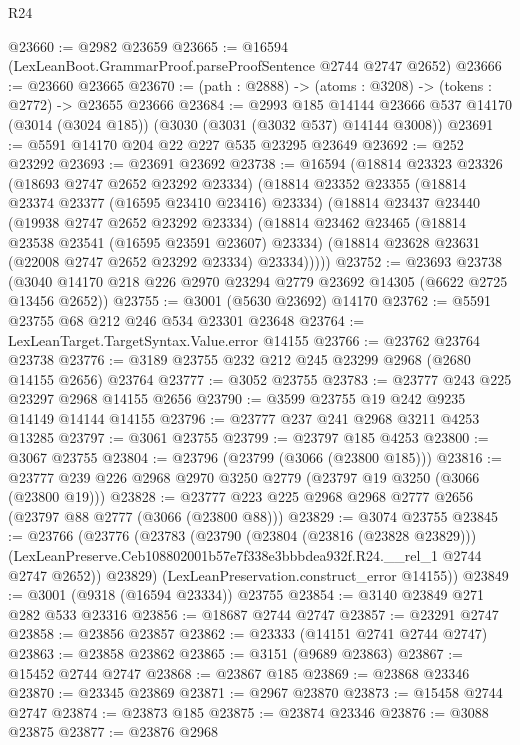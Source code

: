 \begin{lexlean}{R24}
\begin{coremodule}
@23660 := @2982 @23659
@23665 := @16594 (LexLeanBoot.GrammarProof.parseProofSentence @2744 @2747 @2652)
@23666 := @23660 @23665
@23670 := (path : @2888) -> (atoms : @3208) -> (tokens : @2772) -> @23655 @23666
@23684 := @2993
    @185
    @14144
    @23666
    @537
    @14170
    (@3014 (@3024 @185))
    (@3030 (@3031 (@3032 @537) @14144 @3008))
@23691 := @5591 @14170 @204 @22 @227 @535 @23295 @23649
@23692 := @252 @23292
@23693 := @23691 @23692
@23738 := @16594
    (@18814
      @23323
      @23326
      (@18693 @2747 @2652 @23292 @23334)
      (@18814
        @23352
        @23355
        (@18814 @23374 @23377 (@16595 @23410 @23416) @23334)
        (@18814
          @23437
          @23440
          (@19938 @2747 @2652 @23292 @23334)
          (@18814
            @23462
            @23465
            (@18814 @23538 @23541 (@16595 @23591 @23607) @23334)
            (@18814 @23628 @23631 (@22008 @2747 @2652 @23292 @23334) @23334)))))
@23752 := @23693
    @23738
    (@3040 @14170 @218 @226 @2970 @23294 @2779 @23692 @14305 (@6622 @2725 @13456 @2652))
@23755 := @3001 (@5630 @23692) @14170
@23762 := @5591 @23755 @68 @212 @246 @534 @23301 @23648
@23764 := LexLeanTarget.TargetSyntax.Value.error @14155
@23766 := @23762 @23764 @23738
@23776 := @3189 @23755 @232 @212 @245 @23299 @2968 (@2680 @14155 @2656) @23764
@23777 := @3052 @23755
@23783 := @23777 @243 @225 @23297 @2968 @14155 @2656
@23790 := @3599 @23755 @19 @242 @9235 @14149 @14144 @14155
@23796 := @23777 @237 @241 @2968 @3211 @4253 @13285
@23797 := @3061 @23755
@23799 := @23797 @185 @4253
@23800 := @3067 @23755
@23804 := @23796 (@23799 (@3066 (@23800 @185)))
@23816 := @23777 @239 @226 @2968 @2970 @3250 @2779 (@23797 @19 @3250 (@3066 (@23800 @19)))
@23828 := @23777 @223 @225 @2968 @2968 @2777 @2656 (@23797 @88 @2777 (@3066 (@23800 @88)))
@23829 := @3074 @23755
@23845 := @23766
    (@23776
      (@23783
        (@23790
          (@23804 (@23816 (@23828 @23829)))
          (LexLeanPreserve.Ceb108802001b57e7f338e3bbbdea932f.R24.__rel_1 @2744 @2747 @2652))
        @23829)
      (LexLeanPreservation.construct_error @14155))
@23849 := @3001 (@9318 (@16594 @23334)) @23755
@23854 := @3140 @23849 @271 @282 @533 @23316
@23856 := @18687 @2744 @2747
@23857 := @23291 @2747
@23858 := @23856 @23857
@23862 := @23333 (@14151 @2741 @2744 @2747)
@23863 := @23858 @23862
@23865 := @3151 (@9689 @23863)
@23867 := @15452 @2744 @2747
@23868 := @23867 @185
@23869 := @23868 @23346
@23870 := @23345 @23869
@23871 := @2967 @23870
@23873 := @15458 @2744 @2747
@23874 := @23873 @185
@23875 := @23874 @23346
@23876 := @3088 @23875
@23877 := @23876 @2968

\end{coremodule}
\end{lexlean}
